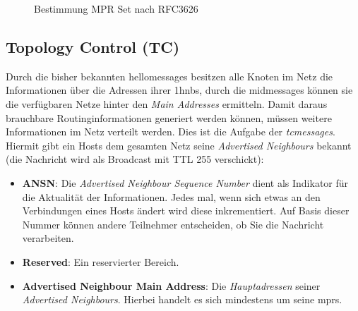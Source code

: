 \begin{figure}
{
  }
  \caption{Bestimmung MPR Set nach RFC3626 \cite{RFC3626}}
  \label{chapter:routing:olsr:mpr:image}
\end{figure}

\subsection{Topology Control (TC)}
\label{chapter:routing:olsr:tc}

Durch die bisher bekannten \glspl{hellomessage} besitzen alle Knoten im Netz die Informationen über die Adressen ihrer \glspl{1hnb}, durch die \glspl{midmessage} können sie die verfügbaren Netze hinter den \textit{Main Addresses} ermitteln. Damit daraus brauchbare Routinginformationen generiert werden können, müssen weitere Informationen im Netz verteilt werden. Dies ist die Aufgabe der \textit{\glspl{tcmessage}}. Hiermit gibt ein Hosts dem gesamten Netz seine \textit{Advertised Neighbours} bekannt (die Nachricht wird als Broadcast mit TTL 255 verschickt): 

\begin{itemize}
\item \textbf{ANSN}: Die \textit{Advertised Neighbour Sequence Number} dient als Indikator für die Aktualität der Informationen. Jedes mal, wenn sich etwas an den Verbindungen eines Hosts ändert wird diese inkrementiert. Auf Basis dieser Nummer können andere Teilnehmer entscheiden, ob Sie die Nachricht verarbeiten.
\item \textbf{Reserved}: Ein reservierter Bereich.
\item \textbf{Advertised Neighbour Main Address}: Die \textit{Hauptadressen} seiner \textit{Advertised Neighbours}. Hierbei handelt es sich mindestens um seine \glspl{mpr}.
\end{itemize}

